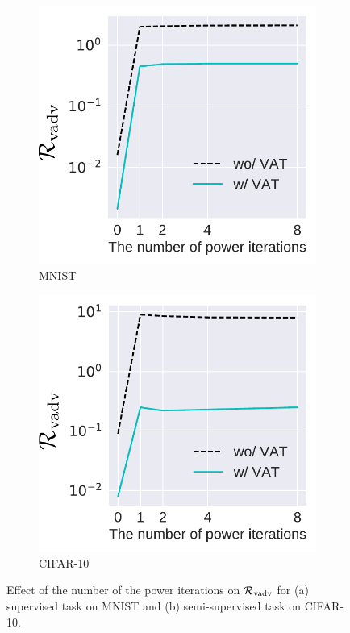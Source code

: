 \documentclass[10pt,journal,compsoc]{IEEEtran}
\begin{document}
\begin{figure}[ht]
	\centering
	\begin{subfigure}{0.24\textwidth}
	\includegraphics[width=\textwidth]{mnist/powiter.pdf}
	\caption{\label{fig:mnist_powiter}MNIST}
    \end{subfigure}
    \begin{subfigure}{0.24\textwidth}
	\includegraphics[width=\textwidth]{cifar10/powiter.pdf}
	\caption{\label{fig:cifar10}CIFAR-10}
    \end{subfigure}
    \caption{\label{fig:powiter}Effect of the number of the power iterations on $\mathcal{R}_{\rm vadv}$ for (a) supervised task on MNIST and (b) semi-supervised task on CIFAR-10.}
\end{figure}
\end{document}
